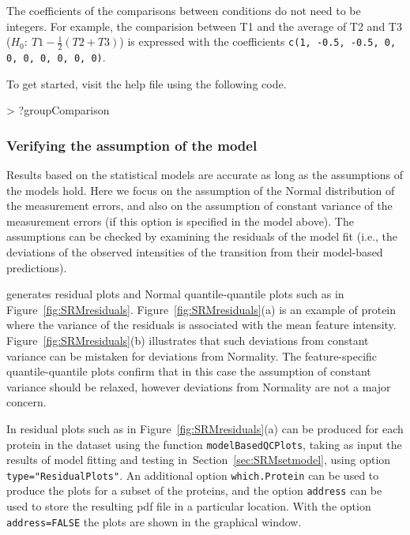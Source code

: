 \documentclass[11pt]{article}
\def\figref#1{Figure~\ref{fig:#1}}
\def\secref#1{Section~\ref{sec:#1}}
\begin{document}
The coefficients of the comparisons between conditions do not need to be integers. For example, the comparision between T1 and the average of T2 and T3 ($H_0:\ T1- \frac{1}{2}(T2+T3)$) is expressed with the coefficients {\tt c(1, -0.5, -0.5, 0, 0, 0, 0, 0, 0, 0)}.

To get started, visit the help file using the following code.
\begin{small}
\begin{Schunk}
\begin{Sinput}
> ?groupComparison
\end{Sinput}
\end{Schunk}
\end{small}




\subsubsection{Verifying the assumption of the model \label{sec:SRMverify}}

Results based on the statistical models are accurate as long as the assumptions of the models hold. Here we focus on the assumption of the Normal distribution of the measurement errors, and also on the assumption of constant variance of the measurement errors (if this option is specified in the model above). The assumptions can be checked by examining the residuals of the model fit (i.e., the deviations of the observed intensities of the transition from their model-based predictions).  

\m generates residual plots and Normal quantile-quantile plots such as in \figref{SRMresiduals}. \figref{SRMresiduals}(a) is an example of protein where the variance of the residuals is associated with the mean feature intensity. \figref{SRMresiduals}(b) illustrates that such deviations from constant variance can be mistaken for deviations from Normality. The feature-specific quantile-quantile plots confirm that in this case the assumption of constant variance should be relaxed, however deviations from Normality are not a major concern.

In \m residual plots such as in  \figref{SRMresiduals}(a) can be produced for each protein in the dataset using the function {\tt modelBasedQCPlots}, taking as input the results of model fitting and testing in~\secref{SRMsetmodel}, using option {\tt type="ResidualPlots"}. An additional option {\tt which.Protein} can be used to produce the plots for a subset of the proteins, and the option {\tt address} can be used to store the resulting pdf file in a particular location. With the option {\tt address=FALSE} the plots are shown in the graphical window.  
\end{document}
